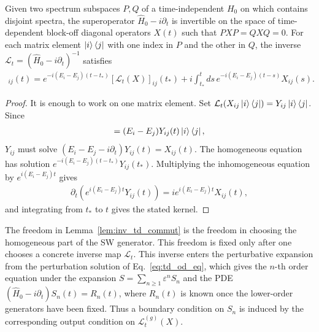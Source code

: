 \begin{lemma}
\label{lem:inv_td_commut}
Given two spectrum subspaces $P,Q$ of a time-independent $H_0$ on which contains disjoint spectra, the superoperator $\hat H_0-i\partial_t$ is invertible on the space of time-dependent block-off diagonal operators $X(t)$ such that $PXP=QXQ=0$.
For each matrix element $\ket i\bra j$ with one index in $P$ and the other in $Q$,
the inverse $\mathcal L_t=(\hat H_0-i\partial_t)^{-1}$ satisfies
\begin{align}
    [\mathcal L_t(X)]_{ij}(t)
    =e^{-i(E_i-E_j)(t-t_\ast)}[\mathcal L_t(X)]_{ij}(t_\ast)
    +i\int_{t_\ast}^{t}ds\,
    e^{-i(E_i-E_j)(t-s)}X_{ij}(s).
\end{align}
\end{lemma}
\begin{proof}
It is enough to work on one matrix element.
Set $\mathcal L_t(X_{ij}\ket i\bra j)=Y_{ij}\ket i\bra j$.
Since
\begin{align}
    [H_0,Y_{ij}(t)\ket i\bra j]
    =(E_i-E_j)Y_{ij}(t)\ket i\bra j,
\end{align}
$Y_{ij}$ must solve
$\left(E_i-E_j-i\partial_t\right)Y_{ij}(t)=X_{ij}(t)$.
The homogeneous equation has solution $e^{-i(E_i-E_j)(t-t_\ast)}Y_{ij}(t_\ast)$.
Multiplying the inhomogeneous equation by $e^{i(E_i-E_j)t}$ gives
\begin{align}
    \partial_t\left(e^{i(E_i-E_j)t}Y_{ij}(t)\right)
    =i e^{i(E_i-E_j)t}X_{ij}(t),
\end{align}
and integrating from $t_\ast$ to $t$ gives the stated kernel.
\end{proof}

The freedom in Lemma~\ref{lem:inv_td_commut} is the freedom in choosing the homogeneous part of the SW generator.
This freedom is fixed only after one chooses a concrete inverse map $\mathcal L_t$.
This inverse enters the perturbative expansion from the perturbation solution of Eq.~\eqref{eq:td_od_eq}, which gives
the $n$-th order equation under the expansion $S=\sum_{n \geq 1}\varepsilon^n S_n$ and the PDE $(\hat H_0-i\partial_t)S_n(t)=R_n(t)$,
where $R_n(t)$ is known once the lower-order generators have been fixed.
Thus a boundary condition on $S_n$ is induced by the corresponding output condition on $\mathcal L_t^{(g)}(X)$.

